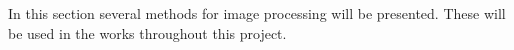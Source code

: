 In this section several methods for image processing will be presented. These will be used in the works throughout this project.